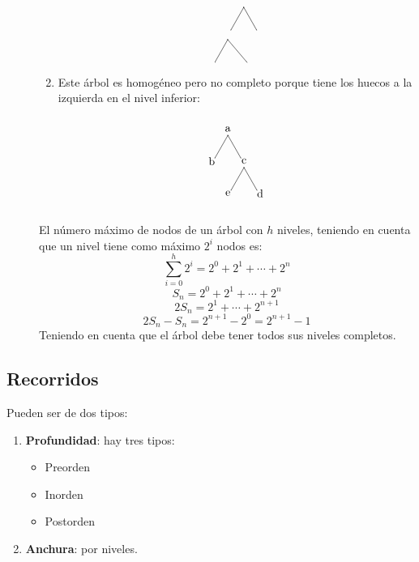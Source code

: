 \documentclass[10pt,a4paper,spanish]{report}
\begin{document}
\begin{description}
\begin{enumerate}[1.]
\[\begin{xy}
\ar@{-} (0,-2);(-4,-9)
\ar@{-} (0,-2);(4,-9)
\ar@{-} (-5,-12);(-9,-19)
\ar@{-} (-5,-12);(1,-19)
\end{xy}\]

\item Este árbol es homogéneo pero no completo porque tiene los huecos a la izquierda en el nivel inferior:
\[\begin{xy}
,(0,0)*+=<10mm>[]\txt<2cm>{a}
,(-5,-10)*+=<10mm>[]\txt<2cm>{b}
,(5,-10)*+=<10mm>[]\txt<2cm>{c}
,(10,-20)*+=<10mm>[]\txt<2cm>{d}
,(0,-20)*+=<10mm>[]\txt<2cm>{e}

\ar@{-} (0,-2);(-4,-9)
\ar@{-} (0,-2);(4,-9)
\ar@{-} (5,-12);(9,-19)
\ar@{-} (5,-12);(1,-19)
\end{xy}\]
\end{enumerate}
El número máximo de nodos de un árbol  con $h$ niveles, teniendo en cuenta que un nivel tiene como máximo $2^{i}$ nodos es:
\begin{displaymath}
\sum_{i=0}^{h} 2^{i} = 2^0 + 2^1 + \cdots + 2^n
\end{displaymath}
\begin{displaymath}
S_n = 2^0 + 2^1 + \cdots + 2^n 
\end{displaymath}
\begin{displaymath}
2S_n = 2^1 + \cdots + 2^{n+1}
\end{displaymath}
\begin{displaymath}
2S_n - S_n = 2^{n+1} - 2^0 = 2^{n+1} - 1
\end{displaymath}
Teniendo en cuenta que el árbol debe tener todos sus niveles completos.
\end{description}

\subsection{\textcolor[rgb]{0.3,0.4,0.8}Recorridos}
\noindent
Pueden ser de dos tipos:
\begin{enumerate}[$\spadesuit$]
\item \textbf{\textcolor[rgb]{0.3,0.4,0.8}{Profundidad}}: hay tres tipos:
\begin{itemize}
\item Preorden
\item Inorden
\item Postorden
\end{itemize}
\item \textbf{\textcolor[rgb]{0.3,0.4,0.8}{Anchura}}: por niveles.
\end{enumerate}
\end{document}
